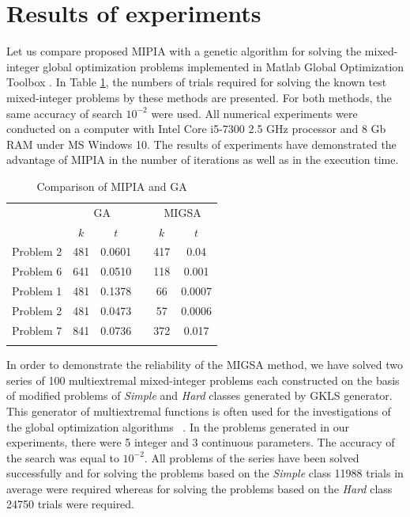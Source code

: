 \documentclass{llncs}
\begin{document}
\section{Results of experiments}

Let us compare proposed MIPIA with a genetic algorithm for solving the mixed-integer global optimization problems implemented in Matlab Global Optimization Toolbox \cite{Matlab}. In Table 
\ref{tab:1}, the numbers of trials required for solving the known test mixed-integer 
problems by these methods are presented. For both methods, the same accuracy of search $10^{-2}$ were used. All numerical experiments were conducted on a 
computer with Intel Core i5-7300 2.5 GHz processor and 8 Gb RAM under MS Windows 10. The 
results of experiments have demonstrated the advantage of MIPIA in the number 
of iterations as well as in the execution time.

\begin{table}
	\caption{Comparison of MIPIA and GA}
	\label{tab:1}
	\center
	\begin{tabular}{cccccc}
		\hline\noalign{\smallskip}
	\multirow{2}{*}{Test problem}	 & \multicolumn{2}{c}{ GA } & & \multicolumn{2}{c}{MIGSA} \\
		\noalign{\smallskip} \cline{2-3} \cline{5-6} \noalign{\smallskip}
		 & $k$ & $t$ & & $k$ & $t$  \\
		\noalign{\smallskip} \hline \noalign{\smallskip}
		 Problem 2 \cite{Floudas}&	481 &	0.0601 & &	417 &	0.04 \\
		 Problem 6 \cite{Floudas}&	641 &	0.0510 & &	118 &	0.001 \\
		 Problem 1 \cite{Deep}   &	481 &	0.1378 & &	66 &	0.0007 \\
		 Problem 2 \cite{Deep}   &	481 &	0.0473 & &	57 &	0.0006 \\
		 Problem 7 \cite{Deep}   &	841 &	0.0736 & & 372	 &	0.017 \\
		\noalign{\smallskip}\hline
	\end{tabular}
\end{table}

In order to demonstrate the reliability of the MIGSA method, we have solved two series of 100 
multiextremal mixed-integer problems each constructed on the basis of modified problems of 
\textit{Simple} and \textit{Hard} classes generated by GKLS generator. %
This generator of multiextremal functions is often used for the investigations of the global optimization algorithms~ 
\cite{Paulavicius2014,SergeyevKvasov2015,Lebedev2015,Gergel2015}.
In the problems generated in our experiments, there were 5 integer  and 3 continuous parameters.
The accuracy of the search %
was equal to $10^{-2}$. All  
problems of the series have been solved successfully and for solving the problems based on 
the \textit{Simple} class 11988 trials in average were required whereas for solving the problems based 
on the \textit{Hard} class 24750 trials were required.
\end{document}
